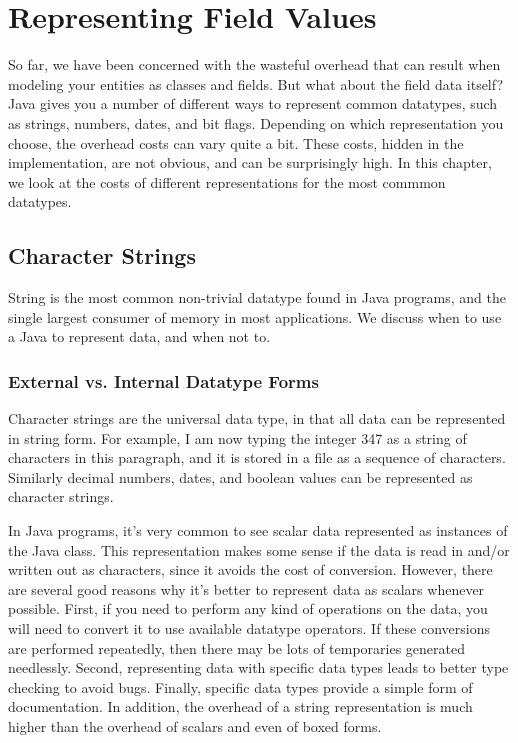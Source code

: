 \chapter{Representing Field Values}
\label{chapter:representing-values}

So far, we have been concerned with the wasteful overhead that can result when
modeling your entities as classes and fields. But what about the field data itself?
Java gives you a number of different ways to represent common datatypes, such
as strings, numbers, dates, and bit flags. Depending on which
representation you choose, the overhead costs can vary quite a bit. 
These costs, hidden in the implementation, are not obvious, and can be
surprisingly high.
In this chapter, we look at the costs of different representations for the most 
commmon datatypes.

\section{Character Strings}
String is the most common non-trivial datatype found in Java programs, and the single largest 
consumer of memory in most applications. We
discuss when to use a Java  to represent data, and when not to.

\subsection{External vs. Internal Datatype Forms}
Character strings are the universal data type, in that all data can be
represented in string form.  For example, I am now typing the integer 347 as a
string of characters in this paragraph, and it is stored in a file as a sequence
of characters. Similarly decimal numbers, dates, and boolean values can be
represented as character strings.
 
In Java programs, it's very common to see scalar data represented as instances
of the Java  class. This representation makes some sense if the
data is read in and/or written out as characters, since it avoids the
cost of conversion. However, there are several good reasons why it's better
to represent data as scalars whenever possible. First, if you need to perform
any kind of operations on the data, you will need to convert it to use
available datatype operators. If these conversions are performed
repeatedly, then there may be lots of temporaries generated needlessly.  Second,
representing data with specific data types leads to better type checking to avoid bugs. 
Finally, specific data types provide a simple form of documentation.
In addition, the overhead of a string representation is much higher than
the overhead of scalars and even of boxed forms.

